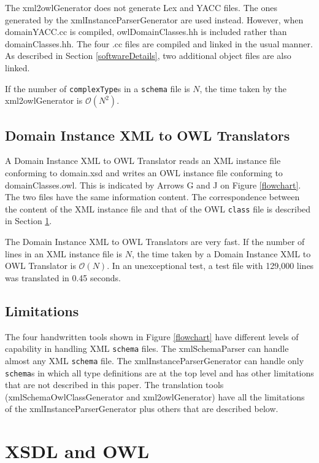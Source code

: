 \documentclass[preprint,12pt]{elsarticle}
\begin{document}
The xml2owlGenerator does not generate Lex and YACC files. The ones
generated by the xmlInstanceParserGenerator are used instead. However, when
domainYACC.cc is compiled, owlDomainClasses.hh is included rather than
domainClasses.hh. The four .cc files are compiled and linked in the usual
manner. As described in Section \ref{softwareDetails}, two additional
object files are also linked.

If the number of {\tt complexType}s in a {\tt schema} file is ${N}$, the
time taken by the xml2owlGenerator is $\mathcal{O}{(N^2)}$.

\subsection{Domain Instance XML to OWL Translators}
A Domain Instance XML to OWL Translator reads an XML instance file
conforming to domain.xsd and writes an OWL instance file conforming to
domainClasses.owl. This is indicated by Arrows G and J on Figure
\ref{flowchart}. The two files have the same information content. The
correspondence between the content of the XML instance file and that of the
OWL {\tt class} file is described in Section \ref{xsdlAndOWL}.

The Domain Instance XML to OWL Translators are very fast. If the number of
lines in an XML instance file is ${N}$, the time taken by a Domain Instance
XML to OWL Translator is $\mathcal{O}{(N)}$. In an unexceptional test, a
test file with 129,000 lines was translated in 0.45 seconds.

\subsection{Limitations}
The four handwritten tools shown in Figure \ref{flowchart} have different
levels of capability in handling XML {\tt schema} files. The
xmlSchemaParser can handle almost any XML {\tt schema} file. The
xmlInstanceParserGenerator can handle only {\tt schema}s in which all type
definitions are at the top level and has other limitations that are not
described in this paper. The translation tools (xmlSchemaOwlClassGenerator
and xml2owlGenerator) have all the limitations of the
xmlInstanceParserGenerator plus others that are described below.

\section{XSDL and OWL}
\label{xsdlAndOWL}
\end{document}
